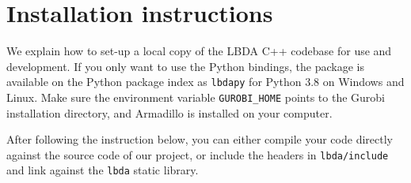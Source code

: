 \documentclass[12pt, english]{article}
\begin{document}
\section{Installation instructions}
\label{sec:installation_instructions}

We explain how to set-up a local copy of the LBDA C++ codebase for use and development. If you only want to use the Python bindings, the package is available on the Python package index as \texttt{lbdapy} for Python 3.8 on Windows and Linux. Make sure the environment variable \texttt{GUROBI\_HOME} points to the Gurobi installation directory, and Armadillo is installed on your computer. 


After following the instruction below, you can either compile your code directly against the source code of our project, or include the headers in \texttt{lbda/include} and link against the \texttt{lbda} static library.
\end{document}
